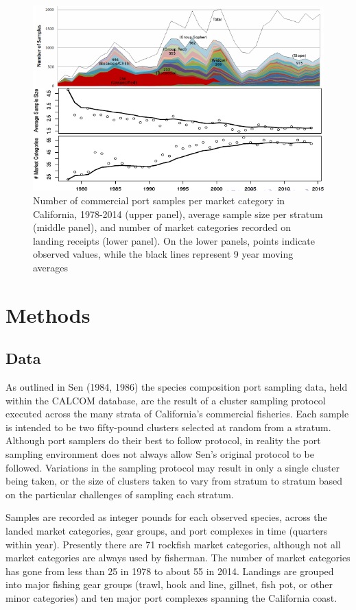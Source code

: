 \documentclass[12pt]{article}
\begin{document}
\begin{figure}[h!]
\centering
\includegraphics[width=\textwidth]{./pictures/sampleComplex.png}
\caption{Number of commercial port samples per market
category in California, 1978-2014 (upper panel), average sample size per
stratum (middle panel), and number of market categories recorded on
landing receipts (lower panel). On the lower panels, points indicate
observed values, while the black lines represent 9 year moving averages}
\label{sparceData}
\end{figure}

\section{Methods}\label{methods}

\subsection{Data}\label{data}

As outlined in Sen (1984, 1986) the species composition port sampling data, 
held within the CALCOM database, are the result of a cluster sampling 
protocol executed across the many strata of California's commercial fisheries. 
Each sample is intended to be two fifty-pound clusters selected 
at random from a stratum. Although port samplers do their best to follow 
protocol, in reality the port sampling environment does not always allow Sen's 
original protocol to be followed. Variations in the sampling protocol may 
result in only a single cluster being taken, or the size of clusters taken to 
vary from stratum to stratum based on the particular challenges of sampling 
each stratum.

Samples are recorded as integer pounds for each observed species, across the 
landed market categories, gear groups, and port complexes in time (quarters 
within year). Presently there are 71 rockfish market categories, although not 
all market categories are always used by fisherman. The number of market 
categories has gone from less than 25 in 1978 to about 55 in 2014. Landings 
are grouped
into major fishing gear groups (trawl, hook and line, gillnet, fish pot,
or other minor categories) and ten major port complexes spanning the
California coast.
\end{document}
